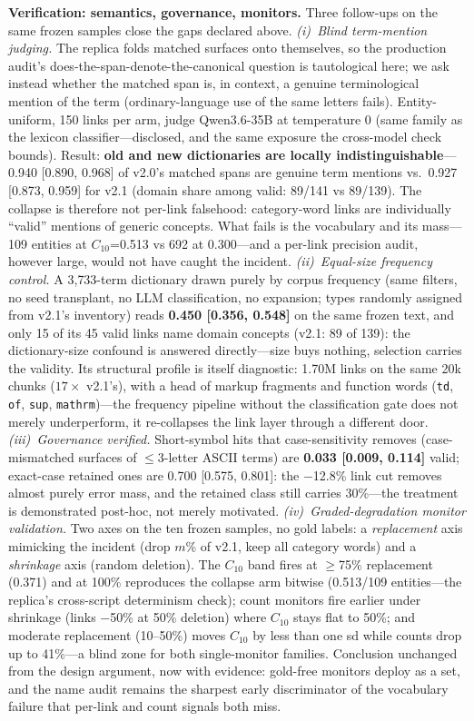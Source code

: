 \documentclass[preprint,12pt]{elsarticle}
\begin{document}
\textbf{Verification: semantics, governance, monitors.}
Three follow-ups on the same frozen samples
close the gaps declared above.
\emph{(i)~Blind term-mention judging.} The replica folds matched
surfaces onto themselves, so the production audit's
does-the-span-denote-the-canonical question is tautological here; we
ask instead whether the matched span is, in context, a genuine
terminological mention of the term (ordinary-language use of the same
letters fails). Entity-uniform, 150 links per arm, judge Qwen3.6-35B at
temperature 0 (same family as the lexicon classifier---disclosed, and
the same exposure the cross-model check bounds). Result: \textbf{old
and new dictionaries are locally indistinguishable}---0.940 [0.890,
0.968] of v2.0's matched spans are genuine term mentions vs.\ 0.927
[0.873, 0.959] for v2.1 (domain share among valid: 89/141 vs 89/139).
The collapse is therefore not per-link falsehood: category-word links
are individually ``valid'' mentions of generic concepts. What fails is
the vocabulary and its mass---109 entities at $C_{10}$=0.513 vs 692 at
0.300---and a per-link precision audit, however large, would not have
caught the incident. \emph{(ii)~Equal-size frequency control.} A
3{,}733-term dictionary drawn purely by corpus frequency (same
$_{\!}$filters, no seed transplant, no LLM classification, no
expansion; types randomly assigned from v2.1's inventory) reads
\textbf{0.450 [0.356, 0.548]} on the same frozen text, and only 15 of
its 45 valid links name domain concepts (v2.1: 89 of 139): the
dictionary-size confound is answered directly---size buys nothing,
selection carries the validity. Its structural profile is itself
diagnostic: 1.70M links on the same 20k chunks ($17\times$ v2.1's),
with a head of markup fragments and function words (\texttt{td},
\texttt{of}, \texttt{sup}, \texttt{mathrm})---the frequency pipeline
without the classification gate does not merely underperform, it
re-collapses the link layer through a different door. \emph{(iii)~Governance verified.}
Short-symbol hits that case-sensitivity removes (case-mismatched
surfaces of $\leq$3-letter ASCII terms) are \textbf{0.033 [0.009,
0.114]} valid; exact-case retained ones are 0.700 [0.575, 0.801]: the
$-$12.8\% link cut removes almost purely error mass, and the retained
class still carries 30\%---the treatment is demonstrated post-hoc, not
merely motivated. \emph{(iv)~Graded-degradation monitor validation.}
Two axes on the ten frozen samples, no gold labels: a
\emph{replacement} axis mimicking the incident (drop $m$\% of v2.1,
keep all category words) and a \emph{shrinkage} axis (random deletion).
The $C_{10}$ band fires at $\geq$75\% replacement (0.371) and at 100\%
reproduces the collapse arm bitwise (0.513/109 entities---the replica's
cross-script determinism check); count monitors fire earlier under
shrinkage (links $-$50\% at 50\% deletion) where $C_{10}$ stays flat
to 50\%; and moderate replacement (10--50\%) moves $C_{10}$ by less
than one sd while counts drop up to 41\%---a blind zone for both single-monitor
families. Conclusion unchanged from the design argument, now with
evidence: gold-free monitors deploy as a set, and the name audit
remains the sharpest early discriminator of the vocabulary failure that
per-link and count signals both miss.
\end{document}
